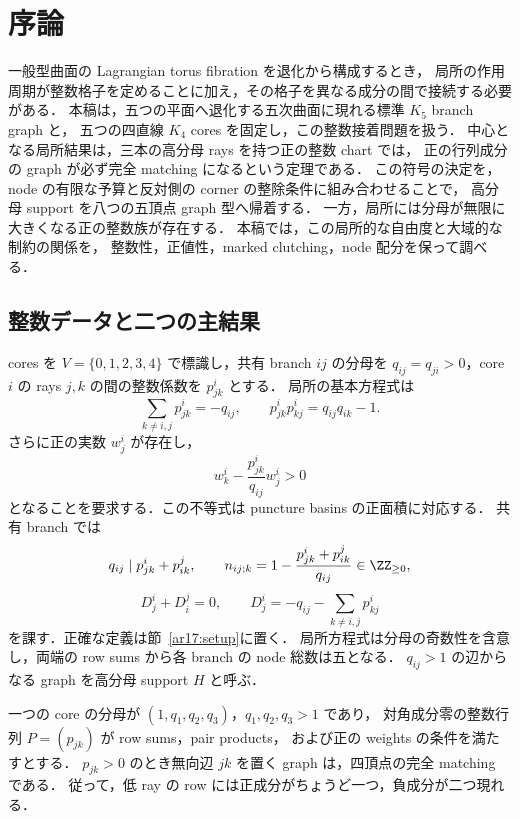 \section{序論}
\label{ar17:introduction}

一般型曲面の Lagrangian torus fibration を退化から構成するとき，
局所の作用周期が整数格子を定めることに加え，その格子を異なる成分の間で接続する必要がある．
本稿は，五つの平面へ退化する五次曲面に現れる標準 $K_5$ branch graph と，
五つの四直線 $K_4$ cores を固定し，この整数接着問題を扱う．
中心となる局所結果は，三本の高分母 rays を持つ正の整数 chart では，
正の行列成分の graph が必ず完全 matching になるという定理である．
この符号の決定を，node の有限な予算と反対側の corner の整除条件に組み合わせることで，
高分母 support を八つの五頂点 graph 型へ帰着する．
一方，局所には分母が無限に大きくなる正の整数族が存在する．
本稿では，この局所的な自由度と大域的な制約の関係を，
整数性，正値性，marked clutching，node 配分を保って調べる．

\subsection{整数データと二つの主結果}

cores を $V=\{0,1,2,3,4\}$ で標識し，共有 branch $ij$ の分母を
$q_{ij}=q_{ji}>0$，core $i$ の rays $j,k$ の間の整数係数を $p^i_{jk}$ とする．
局所の基本方程式は
\[
 \sum_{k\ne i,j}p^i_{jk}=-q_{ij},\qquad
 p^i_{jk}p^i_{kj}=q_{ij}q_{ik}-1.
\]
さらに正の実数 $w^i_j$ が存在し，
\[
 w^i_k-\frac{p^i_{jk}}{q_{ij}}w^i_j>0
\]
となることを要求する．この不等式は puncture basins の正面積に対応する．
共有 branch では
\[
 q_{ij}\mid p^i_{jk}+p^j_{ik},\qquad
 n_{ij;k}=1-\frac{p^i_{jk}+p^j_{ik}}{q_{ij}}\in\ZZ_{\ge0},
\]
\[
 D^i_j+D^j_i=0,\qquad
 D^i_j=-q_{ij}-\sum_{k\ne i,j}p^i_{kj}
\]
を課す．正確な定義は節~\ref{ar17:setup}に置く．
局所方程式は分母の奇数性を含意し，両端の row sums から各 branch の node 総数は五となる．
$q_{ij}>1$ の辺からなる graph を高分母 support $H$ と呼ぶ．

\begin{theorem}
\label{ar18:main-matching}
一つの core の分母が $(1,q_1,q_2,q_3)$，$q_1,q_2,q_3>1$ であり，
対角成分零の整数行列 $P=(p_{jk})$ が row sums，pair products，
および正の weights の条件を満たすとする．
$p_{jk}>0$ のとき無向辺 $jk$ を置く graph は，四頂点の完全 matching である．
従って，低 ray の row には正成分がちょうど一つ，負成分が二つ現れる．
\end{theorem}

